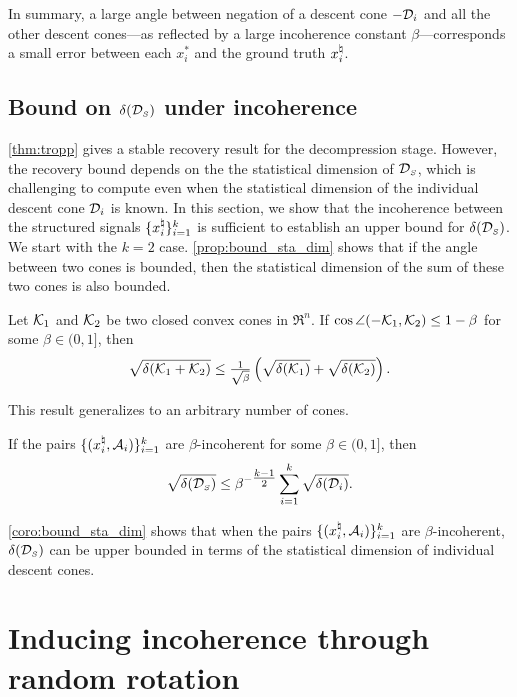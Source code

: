 In summary, a large angle between negation of a descent cone $-\mathcal{D}_i$ and all the other descent cones---as reflected by a large incoherence constant $\beta$---corresponds a small error between each $x_i^*$ and the ground truth $x_i^{\natural}$.

\subsection{Bound on \texorpdfstring{$\delta(\mathcal{D}_{\scriptscriptstyle S})$}{Ds} under incoherence}\label{sec:3.1}

\autoref{thm:tropp} gives a stable recovery result for the decompression stage. However, the recovery bound depends on the the statistical dimension of $\mathcal{D}_{\scriptscriptstyle S}$, which is challenging to compute even when the statistical dimension of the individual descent cone $\mathcal{D}_i$ is known. In this section, we show that the incoherence between the structured signals $\{x_i^{\natural}\}_{i=1}^k$ is sufficient to establish an upper bound for $\delta(\mathcal{D}_{\scriptscriptstyle S})$. 
We start with the $k = 2$ case. \autoref{prop:bound_sta_dim} shows that if the angle between two cones is bounded, then the statistical dimension of the sum of these two cones is also bounded. 

\begin{proposition}\label{prop:bound_sta_dim}
    Let $\mathcal{K}_1$ and $\mathcal{K}_2$ be two closed convex cones in $\Re^n$. If $\cos\angle(-\mathcal{K}_1, \mathcal{K}_2) \leq 1 - \beta$ for some $\beta \in (0, 1]$, then 
    \[\sqrt{\delta(\mathcal{K}_1 + \mathcal{K}_2)} \leq \tfrac{1}{\sqrt{\beta}}\left(\sqrt{\delta(\mathcal{K}_1)} + \sqrt{\delta(\mathcal{K}_2)} \right).\]
\end{proposition}

This result generalizes to an arbitrary number of cones. 
\begin{corollary}\label{coro:bound_sta_dim}
   If the pairs $\{(x_i^{\natural}, \mathcal{A}_i)\}_{i=1}^k$ are $\beta$-incoherent for some $\beta\in(0,1]$, then
   \[\sqrt{\delta(\mathcal{D}_{\scriptscriptstyle S})} \leq \beta^{-\tfrac{k-1}{2}}\sum_{i=1}^k\sqrt{\delta(\mathcal{D}_i)}.\]
\end{corollary} 
\autoref{coro:bound_sta_dim} shows that when the pairs $\{(x_i^{\natural}, \mathcal{A}_i)\}_{i=1}^k$ are $\beta$-incoherent, $\delta(\mathcal{D}_{\scriptscriptstyle S})$ can be upper bounded in terms of the statistical dimension of individual descent cones.

\section{Inducing incoherence through random rotation}\label{sec-incoherence}


